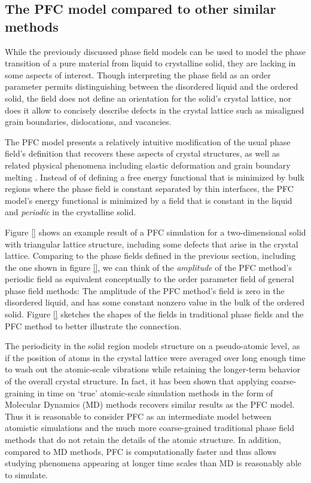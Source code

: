\documentclass[a4paper]{article}
\begin{document}
\subsection{The PFC model compared to other similar methods}\label{subsec:pfc_comparepf}

While the previously discussed phase field models can be used to model the phase transition of a pure material from liquid to crystalline solid, they are lacking in some aspects of interest. Though interpreting the phase field as an order parameter permits distinguishing between the disordered liquid and the ordered solid, the field does not define an orientation for the solid's crystal lattice, nor does it allow to concisely describe defects in the crystal lattice such as misaligned grain boundaries, dislocations, and vacancies.

The PFC model presents a relatively intuitive modification of the usual phase field's definition that recovers these aspects of crystal structures, as well as related physical phenomena including elastic deformation \cite{elder02} and grain boundary melting \cite{elder08}. Instead of of defining a free energy functional that is minimized by bulk regions where the phase field is constant separated by thin interfaces, the PFC model's energy functional is minimized by a field that is constant in the liquid and \textit{periodic} in the crystalline solid. 

Figure \ref{} shows an example result of a PFC simulation for a two-dimensional solid with triangular lattice structure, including some defects that arise in the crystal lattice. Comparing to the phase fields defined in the previous section, including the one shown in figure \ref{}, we can think of the \textit{amplitude} of the PFC method's periodic field as equivalent conceptually to the order parameter field of general phase field methods: The amplitude of the PFC method's field is zero in the disordered liquid, and has some constant nonzero value in the bulk of the ordered solid. Figure \ref{} sketches the shapes of the fields in traditional phase fields and the PFC method to better illustrate the connection.

The periodicity in the solid region models structure on a pseudo-atomic level, as if the position of atoms in the crystal lattice were averaged over long enough time to wash out the atomic-scale vibrations while retaining the longer-term behavior of the overall crystal structure. In fact, it has been shown \cite{grant08} that applying coarse-graining in time on `true' atomic-scale simulation methods in the form of Molecular Dynamics (MD) methods recovers similar results as the PFC model. Thus it is reasonable to consider PFC as an intermediate model between atomistic simulations and the much more coarse-grained traditional phase field methods that do not retain the details of the atomic structure. In addition, compared to MD methods, PFC is computationally faster and thus allows studying phenomena appearing at longer time scales than MD is reasonably able to simulate.%
\end{document}
